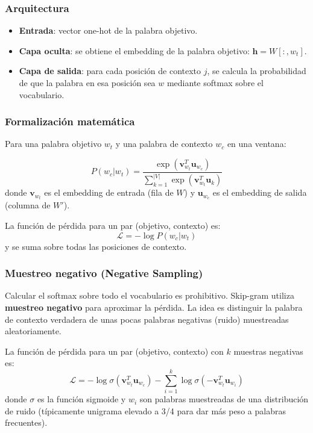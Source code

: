 \documentclass[12pt,a4paper,openany,oneside]{book}
\begin{document}
\subsubsection{Arquitectura}
\begin{itemize}
    \item \textbf{Entrada}: vector one-hot de la palabra objetivo.
    \item \textbf{Capa oculta}: se obtiene el embedding de la palabra objetivo: \(\mathbf{h} = W[:, w_t]\).
    \item \textbf{Capa de salida}: para cada posición de contexto \(j\), se calcula la probabilidad de que la palabra en esa posición sea \(w\) mediante softmax sobre el vocabulario.
\end{itemize}

\subsubsection{Formalización matemática}
Para una palabra objetivo \(w_t\) y una palabra de contexto \(w_c\) en una ventana:

\[
P(w_c | w_t) = \frac{\exp(\mathbf{v}_{w_t}^T \mathbf{u}_{w_c})}{\sum_{k=1}^{|V|} \exp(\mathbf{v}_{w_t}^T \mathbf{u}_{k})}
\]
donde \(\mathbf{v}_{w_t}\) es el embedding de entrada (fila de \(W\)) y \(\mathbf{u}_{w_c}\) es el embedding de salida (columna de \(W'\)).

La función de pérdida para un par (objetivo, contexto) es:
\[
\mathcal{L} = -\log P(w_c | w_t)
\]
y se suma sobre todas las posiciones de contexto.

\subsubsection{Muestreo negativo (Negative Sampling)}
Calcular el softmax sobre todo el vocabulario es prohibitivo. Skip-gram utiliza \textbf{muestreo negativo} para aproximar la pérdida. La idea es distinguir la palabra de contexto verdadera de unas pocas palabras negativas (ruido) muestreadas aleatoriamente.

La función de pérdida para un par (objetivo, contexto) con \(k\) muestras negativas es:
\[
\mathcal{L} = -\log \sigma(\mathbf{v}_{w_t}^T \mathbf{u}_{w_c}) - \sum_{i=1}^k \log \sigma(-\mathbf{v}_{w_t}^T \mathbf{u}_{w_i})
\]
donde \(\sigma\) es la función sigmoide y \(w_i\) son palabras muestreadas de una distribución de ruido (típicamente unigrama elevado a 3/4 para dar más peso a palabras frecuentes).
\end{document}
